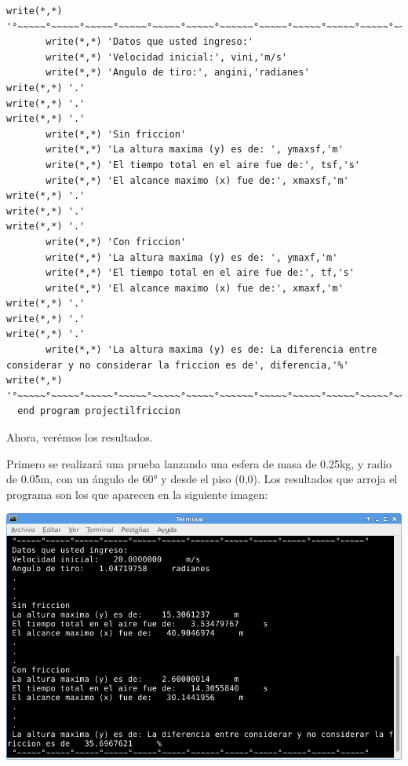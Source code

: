 \documentclass[12pt]{article}
\begin{document}
\begin{verbatim}
write(*,*) '°~~~~~°~~~~~°~~~~~°~~~~~°~~~~~°~~~~~°~~~~~~°~~~~~°~~~~~°~~~~~°~~~~~°~~~~~°'
       write(*,*) 'Datos que usted ingreso:'
       write(*,*) 'Velocidad inicial:', vini,'m/s'
       write(*,*) 'Angulo de tiro:', angini,'radianes'
write(*,*) '.'
write(*,*) '.'
write(*,*) '.'
       write(*,*) 'Sin friccion'
       write(*,*) 'La altura maxima (y) es de: ', ymaxsf,'m'
       write(*,*) 'El tiempo total en el aire fue de:', tsf,'s'
       write(*,*) 'El alcance maximo (x) fue de:', xmaxsf,'m'
write(*,*) '.'
write(*,*) '.'
write(*,*) '.'
       write(*,*) 'Con friccion'
       write(*,*) 'La altura maxima (y) es de: ', ymaxf,'m'
       write(*,*) 'El tiempo total en el aire fue de:', tf,'s'
       write(*,*) 'El alcance maximo (x) fue de:', xmaxf,'m'
write(*,*) '.'
write(*,*) '.'
write(*,*) '.'
       write(*,*) 'La altura maxima (y) es de: La diferencia entre considerar y no considerar la friccion es de', diferencia,'%'
write(*,*) '°~~~~~°~~~~~°~~~~~°~~~~~°~~~~~°~~~~~°~~~~~~°~~~~~°~~~~~°~~~~~°~~~~~°~~~~~°'
  end program projectilfriccion 

\end{verbatim}

Ahora, verémos los resultados.

Primero se realizará una prueba lanzando una esfera de masa de 0.25kg, y radio de 0.05m, con un ángulo de 60° y desde el piso (0,0).
Los resultados que arroja el programa son los que aparecen en la siguiente imagen:

{
 \hspace{20cm}
\begin{center}
\includegraphics[width=17cm]{resul60.png}\\
\end{center}
}
\end{document}
